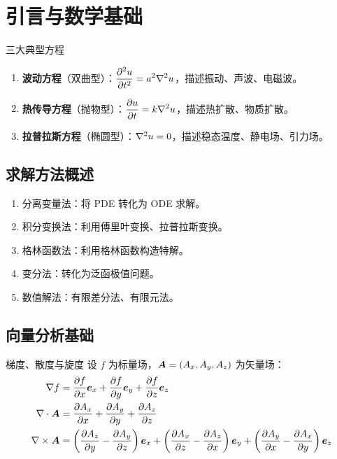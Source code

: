 ﻿\chapter{引言与数学基础}

\begin{mydefinition}{三大典型方程}
\begin{enumerate}
	\item \textbf{波动方程}（双曲型）：$\displaystyle\frac{\partial^2 u}{\partial t^2}=a^2\nabla^2 u$，描述振动、声波、电磁波。
	\item \textbf{热传导方程}（抛物型）：$\displaystyle\frac{\partial u}{\partial t}=k\nabla^2 u$，描述热扩散、物质扩散。
	\item \textbf{拉普拉斯方程}（椭圆型）：$\nabla^2 u=0$，描述稳态温度、静电场、引力场。
\end{enumerate}
\end{mydefinition}

\section{求解方法概述}
\begin{enumerate}
	\item 分离变量法：将 PDE 转化为 ODE 求解。
	\item 积分变换法：利用傅里叶变换、拉普拉斯变换。
	\item 格林函数法：利用格林函数构造特解。
	\item 变分法：转化为泛函极值问题。
	\item 数值解法：有限差分法、有限元法。
\end{enumerate}

\section{向量分析基础}

\begin{mydefinition}{梯度、散度与旋度}
设 $f$ 为标量场，$\boldsymbol{A}=(A_x,A_y,A_z)$ 为矢量场：
\begin{align*}
	\nabla f&=\frac{\partial f}{\partial x}\boldsymbol{e}_x+\frac{\partial f}{\partial y}\boldsymbol{e}_y+\frac{\partial f}{\partial z}\boldsymbol{e}_z\\
	\nabla \cdot\boldsymbol{A}&=\frac{\partial A_x}{\partial x}+\frac{\partial A_y}{\partial y}+\frac{\partial A_z}{\partial z}\\
	\nabla \times\boldsymbol{A}&=\left(\frac{\partial A_z}{\partial y}-\frac{\partial A_y}{\partial z}\right)\boldsymbol{e}_x+\left(\frac{\partial A_x}{\partial z}-\frac{\partial A_z}{\partial x}\right)\boldsymbol{e}_y+\left(\frac{\partial A_y}{\partial x}-\frac{\partial A_x}{\partial y}\right)\boldsymbol{e}_z
\end{align*}
\end{mydefinition}

